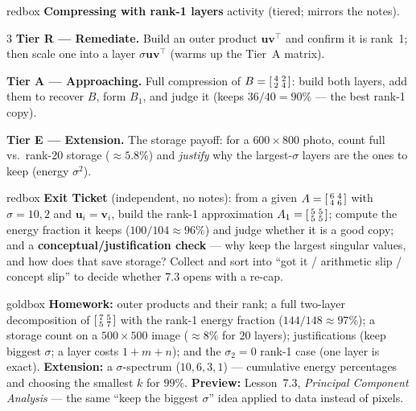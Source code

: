 \documentclass[10pt]{article}
\newcommand{\uu}{\mathbf{u}}
\newcommand{\vv}{\mathbf{v}}
\newcommand{\T}{^{\top}}
\begin{document}
\begin{skillbox}{redbox}
\textbf{Compressing with rank-1 layers} activity (tiered; mirrors the notes).
\begin{multicols}{3}
\textbf{Tier R --- Remediate.} Build an outer product $\uu\vv\T$ and confirm it is rank~1; then scale one
into a layer $\sigma\uu\vv\T$ (warms up the Tier~A matrix).

\columnbreak
\textbf{Tier A --- Approaching.} Full compression of $B=\begin{bsmallmatrix} 4 & 2\\ 2 & 4 \end{bsmallmatrix}$:
build both layers, add them to recover $B$, form $B_1$, and judge it (keeps $36/40=90\%$ --- the best
rank-1 copy).

\columnbreak
\textbf{Tier E --- Extension.} The storage payoff: for a $600\times800$ photo, count full vs.\ rank-20
storage ($\approx5.8\%$) and \emph{justify} why the largest-$\sigma$ layers are the ones to keep (energy $\sigma^2$).
\end{multicols}
\end{skillbox}

\begin{skillbox}{redbox}
\textbf{Exit Ticket} (independent, no notes): from a given $A=\begin{bsmallmatrix} 6 & 4\\ 4 & 6 \end{bsmallmatrix}$
with $\sigma=10,2$ and $\uu_i=\vv_i$, build the rank-1 approximation $A_1=\begin{bsmallmatrix} 5 & 5\\ 5 & 5 \end{bsmallmatrix}$;
compute the energy fraction it keeps ($100/104\approx96\%$) and judge whether it is a good copy; and a
\textbf{conceptual/justification check} --- why keep the largest singular values, and how does that save
storage? Collect and sort into ``got it / arithmetic slip / concept slip'' to decide whether 7.3 opens
with a re-cap.
\end{skillbox}

\begin{skillbox}{goldbox}
\textbf{Homework:} outer products and their rank; a full two-layer decomposition of
$\begin{bsmallmatrix} 7 & 5\\ 5 & 7 \end{bsmallmatrix}$ with the rank-1 energy fraction ($144/148\approx97\%$);
a storage count on a $500\times500$ image ($\approx8\%$ for $20$ layers); justifications (keep biggest
$\sigma$; a layer costs $1+m+n$); and the $\sigma_2=0$ rank-1 case (one layer is exact).
\textbf{Extension:} a $\sigma$-spectrum ($10,6,3,1$) --- cumulative energy percentages and choosing the
smallest $k$ for $99\%$. \textbf{Preview:} Lesson~7.3, \emph{Principal Component Analysis} --- the same
``keep the biggest $\sigma$'' idea applied to data instead of pixels.
\end{skillbox}
\end{document}
